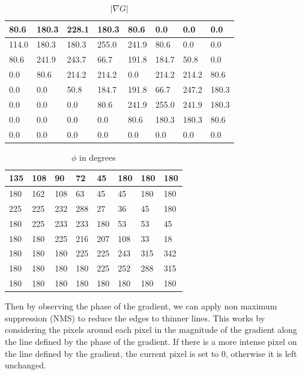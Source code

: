 \documentclass[12pt, letterpaper]{article}
\begin{document}
\begin{table}[H]
    \centering
    \begin{tabular}{|l|l|l|l|l|l|l|l|}
    \hline
        80.6 & 180.3 & 228.1 & 180.3 & 80.6 & 0.0 & 0.0 & 0.0 \\ \hline
        114.0 & 180.3 & 180.3 & 255.0 & 241.9 & 80.6 & 0.0 & 0.0 \\ \hline
        80.6 & 241.9 & 243.7 & 66.7 & 191.8 & 184.7 & 50.8 & 0.0 \\ \hline
        0.0 & 80.6 & 214.2 & 214.2 & 0.0 & 214.2 & 214.2 & 80.6 \\ \hline
        0.0 & 0.0 & 50.8 & 184.7 & 191.8 & 66.7 & 247.2 & 180.3 \\ \hline
        0.0 & 0.0 & 0.0 & 80.6 & 241.9 & 255.0 & 241.9 & 180.3 \\ \hline
        0.0 & 0.0 & 0.0 & 0.0 & 80.6 & 180.3 & 180.3 & 80.6 \\ \hline
        0.0 & 0.0 & 0.0 & 0.0 & 0.0 & 0.0 & 0.0 & 0.0 \\ \hline
    \end{tabular}
    \caption{$|\nabla G|$}
\end{table}

\begin{table}[H]
    \centering
    \begin{tabular}{|l|l|l|l|l|l|l|l|}
    \hline
        135 & 108 & 90 & 72 & 45 & 180 & 180 & 180 \\ \hline
        180 & 162 & 108 & 63 & 45 & 45 & 180 & 180 \\ \hline
        225 & 225 & 232 & 288 & 27 & 36 & 45 & 180 \\ \hline
        180 & 225 & 233 & 233 & 180 & 53 & 53 & 45 \\ \hline
        180 & 180 & 225 & 216 & 207 & 108 & 33 & 18 \\ \hline
        180 & 180 & 180 & 225 & 225 & 243 & 315 & 342 \\ \hline
        180 & 180 & 180 & 180 & 225 & 252 & 288 & 315 \\ \hline
        180 & 180 & 180 & 180 & 180 & 180 & 180 & 180 \\ \hline
    \end{tabular}
    \caption{$\phi$ in degrees}
\end{table}


Then by observing the phase of the gradient, we can apply non maximum suppression (NMS) to reduce the edges to thinner lines. This works by considering the pixels around each pixel in the magnitude of the gradient along the line defined by the phase of the gradient. If there is a more intense pixel on the line defined by the gradient, the current pixel is set to 0, otherwise it is left unchanged.
\end{document}
